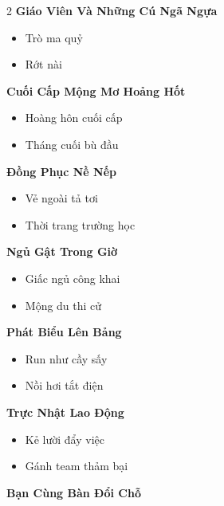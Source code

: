 \begin{multicols}{2}
\textbf{\color{chapterline}Giáo Viên Và Những Cú Ngã Ngựa}
\begin{itemize}[leftmargin=1.2em, itemsep=0.1em, label=\textcolor{titlecolor}{\tiny$\blacksquare$}]
  \item Trò ma quỷ
  \item Rớt nài
\end{itemize}
\vspace{0.8em}
\textbf{\color{chapterline}Cuối Cấp Mộng Mơ Hoảng Hốt}
\begin{itemize}[leftmargin=1.2em, itemsep=0.1em, label=\textcolor{titlecolor}{\tiny$\blacksquare$}]
  \item Hoàng hôn cuối cấp
  \item Tháng cuối bù đầu
\end{itemize}
\vspace{0.8em}
\textbf{\color{chapterline}Đồng Phục Nề Nếp}
\begin{itemize}[leftmargin=1.2em, itemsep=0.1em, label=\textcolor{titlecolor}{\tiny$\blacksquare$}]
  \item Vẻ ngoài tả tơi
  \item Thời trang trường học
\end{itemize}
\vspace{0.8em}
\textbf{\color{chapterline}Ngủ Gật Trong Giờ}
\begin{itemize}[leftmargin=1.2em, itemsep=0.1em, label=\textcolor{titlecolor}{\tiny$\blacksquare$}]
  \item Giấc ngủ công khai
  \item Mộng du thi cử
\end{itemize}
\vspace{0.8em}
\textbf{\color{chapterline}Phát Biểu Lên Bảng}
\begin{itemize}[leftmargin=1.2em, itemsep=0.1em, label=\textcolor{titlecolor}{\tiny$\blacksquare$}]
  \item Run như cầy sấy
  \item Nồi hơi tắt điện
\end{itemize}
\vspace{0.8em}
\textbf{\color{chapterline}Trực Nhật Lao Động}
\begin{itemize}[leftmargin=1.2em, itemsep=0.1em, label=\textcolor{titlecolor}{\tiny$\blacksquare$}]
  \item Kẻ lười đẩy việc
  \item Gánh team thảm bại
\end{itemize}
\vspace{0.8em}
\textbf{\color{chapterline}Bạn Cùng Bàn Đổi Chỗ}

\end{multicols}
